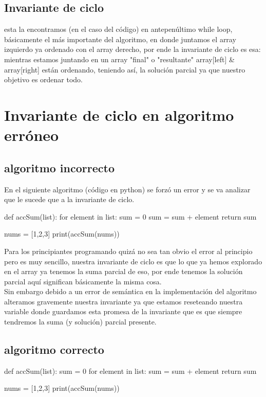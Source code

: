 \documentclass{article}
\begin{document}
\subsection*{Invariante de ciclo}\label{Idc}
esta la encontramos (en el caso del código) en antepenúltimo while loop, básicamente
el más importante del algoritmo, en donde juntamos el array izquierdo ya ordenado con el 
array derecho, por ende la invariante de ciclo es esa: mientras estamos juntando en un 
array "final" o "resultante" array[left] \& array[right] están ordenando, teniendo así, 
la solución parcial ya que nuestro objetivo es ordenar todo.  
\section{Invariante de ciclo en algoritmo erróneo}\label{Idceae}

\subsection*{algoritmo incorrecto}\label{algoI}
En el siguiente algoritmo (código en python) se forzó un error y se va analizar que le 
sucede que a la invariante de ciclo.

\begin{code}
  def accSum(list):
    for element in list:
        sum = 0
        sum = sum + element
    return sum

nums = [1,2,3]
print(accSum(nums))
\end{code}

Para los principiantes programando quizá no sea tan obvio el error al principio
pero es muy sencillo, nuestra invariante de ciclo es que lo que ya hemos explorado en el
array ya tenemos la suma parcial de eso, por ende tenemos la solución parcial aquí significan 
básicamente la misma cosa.\\
Sin embargo debido a un error de semántica en la implementación del algoritmo alteramos gravemente
nuestra invariante ya que estamos reseteando nuestra variable donde guardamos esta promesa de
la invariante que es que siempre tendremos la suma (y solución) parcial presente.


\subsection*{algoritmo correcto}\label{algo}
\begin{code}
  def accSum(list):
  sum = 0
    for element in list:
        sum = sum + element
    return sum

nums = [1,2,3]
print(accSum(nums))
\end{code}
\end{document}
